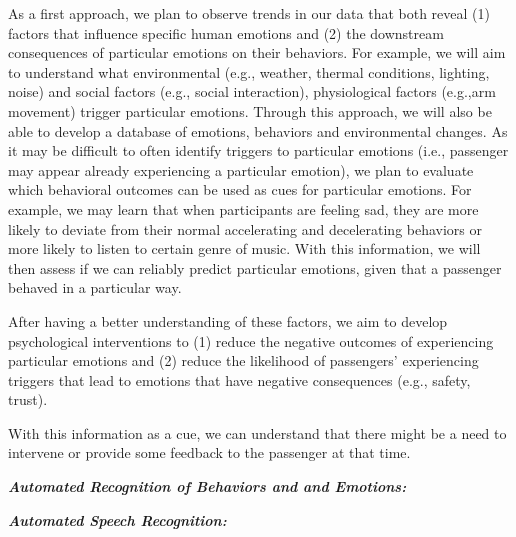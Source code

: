 As a first approach, we plan to observe trends in our data that both reveal (1) factors that influence specific human emotions and (2) the downstream consequences of particular emotions on their behaviors. For example, we will aim to understand what environmental (e.g., weather, thermal conditions, lighting, noise) and social factors (e.g., social interaction), physiological factors (e.g.,arm movement) trigger particular emotions. Through this approach, we will also be able to develop a database of  emotions, behaviors and environmental changes. %
As it may be difficult to often identify triggers to particular emotions (i.e., passenger may appear already experiencing a particular emotion), we plan to evaluate which behavioral outcomes can be used as cues for particular emotions. For example, we may learn that when participants are feeling sad, they are more likely to deviate from their normal accelerating and decelerating behaviors or more likely to listen to certain genre of music. With this information, we will then assess if we can reliably predict particular emotions, given that a passenger behaved in a particular way. 

After having a better understanding of these factors, we aim to develop psychological interventions to (1) reduce the negative outcomes of experiencing particular emotions  and (2) reduce the likelihood of passengers’ experiencing triggers that lead to emotions that have negative consequences (e.g., safety, trust). 


With this information as a cue, we can understand that there might be a need to intervene or provide some feedback to the passenger at that time. 



\noindent\textbf{\em Automated Recognition of Behaviors and and Emotions:} \vskip 0.2in


\noindent\textbf{\em Automated Speech Recognition:} \vskip 0.2in



